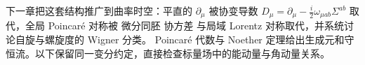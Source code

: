 下一章把这套结构推广到曲率时空：平直的 $\partial_\mu$ 被协变导数 $D_\mu=\partial_\mu-\frac{i}{2}\omega_{\mu ab}\Sigma^{ab}$ 取代，全局 Poincaré 对称被 微分同胚 协方差 与局域 Lorentz 对称取代，并系统讨论自旋与螺旋度的 Wigner 分类。
Poincaré 代数与 Noether 定理给出生成元和守恒流。以下保留同一变分约定，直接检查标量场中的能动量与角动量关系。







